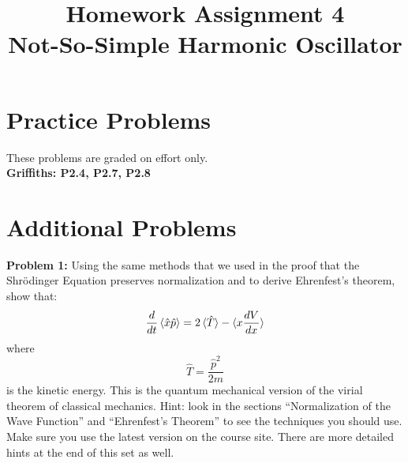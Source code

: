 \documentclass[12pt]{article}
\begin{document}
\newcommand{\ihbar}{\ensuremath{i \hbar}}
\newcommand{\dPsidt}{\ensuremath{ \frac{\partial \Psi}{\partial t} }}
\newcommand{\dPsidx}{\ensuremath{ \frac{\partial \Psi}{\partial x} }}
\newcommand{\ddPsidx}{\ensuremath{ \frac{\partial^2 \Psi}{\partial x^2} }}
\newcommand{\dPssdt}{\ensuremath{ \frac{\partial \Psi^*}{\partial t} }}
\newcommand{\dPssdx}{\ensuremath{ \frac{\partial \Psi^*}{\partial x} }}
\newcommand{\ddPssdx}{\ensuremath{ \frac{\partial^2 \Psi^*}{\partial x^2} }}

\newcommand{\dphidt}{\ensuremath{ \frac{d \phi}{dt} }}
\newcommand{\dpsidx}{\ensuremath{ \frac{d \psi}{dx} }}
\newcommand{\ddpsidx}{\ensuremath{ \frac{d^2 \psi}{dx^2} }}


\date{\vspace{-5ex}}

\title{Homework Assignment 4 \\ Not-So-Simple Harmonic Oscillator}

\maketitle

\section*{Practice Problems}

These problems are graded on effort only.\\

\noindent
{\bf Griffiths: P2.4, P2.7, P2.8} \\

\section*{Additional Problems}

\noindent
    {\bf Problem 1:} Using the same methods that we used in the proof that the Shr\"odinger Equation preserves normalization and to derive Ehrenfest's theorem, show that:
$$\frac{d}{dt}\braket{\hat{x}\hat{p}} = 2\braket{\hat{T}} - \braket{x \frac{dV}{dx}}$$
where
$$\hat{T} = \frac{\hat{p}^2}{2m}$$
is the kinetic energy.  This is the quantum mechanical version of the virial theorem of classical mechanics.  Hint: look in the sections ``Normalization of the Wave Function'' and ``Ehrenfest's Theorem'' to see the techniques you should use.  Make sure you use the latest version on the course site.  There are more detailed hints at the end of this set as well.\\ 
\end{document}
